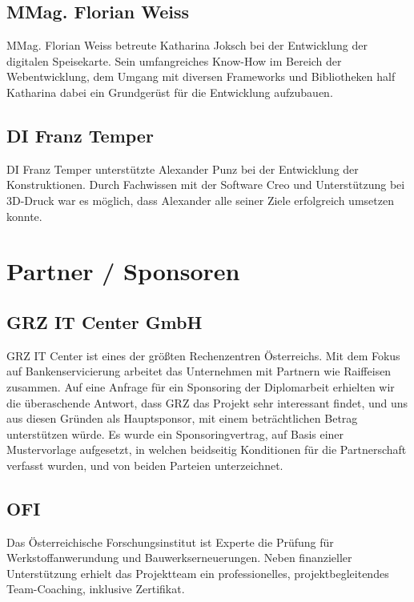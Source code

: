   \subsection*{MMag. Florian Weiss}
  MMag. Florian Weiss betreute Katharina Joksch bei der Entwicklung der digitalen Speisekarte. Sein umfangreiches
  Know-How im Bereich der Webentwicklung, dem Umgang mit diversen Frameworks und Bibliotheken half Katharina
  dabei ein Grundgerüst für die Entwicklung aufzubauen.

  \subsection*{DI Franz Temper}
  DI Franz Temper unterstützte Alexander Punz bei der Entwicklung der Konstruktionen. Durch Fachwissen mit
  der Software Creo und Unterstützung bei 3D-Druck war es möglich, dass Alexander alle seiner Ziele erfolgreich
  umsetzen konnte.

\section{Partner / Sponsoren}

\subsection*{GRZ IT Center GmbH}
{GRZ IT Center\cite{grz}} ist eines der größten Rechenzentren Österreichs. Mit dem Fokus auf Bankenservicierung arbeitet das Unternehmen
mit Partnern wie Raiffeisen zusammen. Auf eine Anfrage für ein Sponsoring der Diplomarbeit erhielten wir die überaschende
Antwort, dass GRZ das Projekt sehr interessant findet, und uns aus diesen Gründen als Hauptsponsor, mit einem beträchtlichen Betrag
unterstützen würde.
Es wurde ein Sponsoringvertrag, auf Basis einer Mustervorlage aufgesetzt, in welchen beidseitig Konditionen für die Partnerschaft
verfasst wurden, und von beiden Parteien unterzeichnet.

\subsection*{OFI}
{Das Österreichische Forschungsinstitut\cite{ofi}} ist Experte die Prüfung für Werkstoffanwerundung
und Bauwerkserneuerungen. Neben finanzieller Unterstützung erhielt das Projektteam
ein professionelles, projektbegleitendes Team-Coaching, inklusive Zertifikat.

